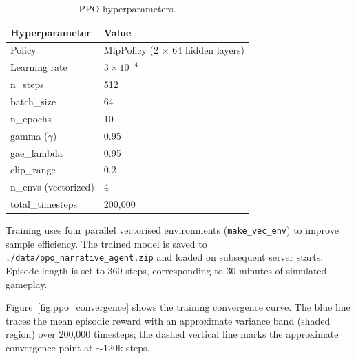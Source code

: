\begin{table}[H]
\centering
\caption{PPO hyperparameters.}
\label{tab:ppo_hyperparams}
\small
\begin{tabular}{@{}ll@{}}
\toprule
\textbf{Hyperparameter} & \textbf{Value} \\
\midrule
Policy & MlpPolicy (2 $\times$ 64 hidden layers) \\
Learning rate & $3 \times 10^{-4}$ \\
n\_steps & 512 \\
batch\_size & 64 \\
n\_epochs & 10 \\
gamma ($\gamma$) & 0.95 \\
gae\_lambda & 0.95 \\
clip\_range & 0.2 \\
n\_envs (vectorized) & 4 \\
total\_timesteps & 200,000 \\
\bottomrule
\end{tabular}
\end{table}

Training uses four parallel vectorised environments (\texttt{make\_vec\_env}) to improve sample efficiency. The trained model is saved to \texttt{./data/ppo\_narrative\_agent.zip} and loaded on subsequent server starts. Episode length is set to 360 steps, corresponding to 30 minutes of simulated gameplay.

Figure~\ref{fig:ppo_convergence} shows the training convergence curve. The blue line traces the mean episodic reward with an approximate variance band (shaded region) over 200,000 timesteps; the dashed vertical line marks the approximate convergence point at $\sim$120k steps.

